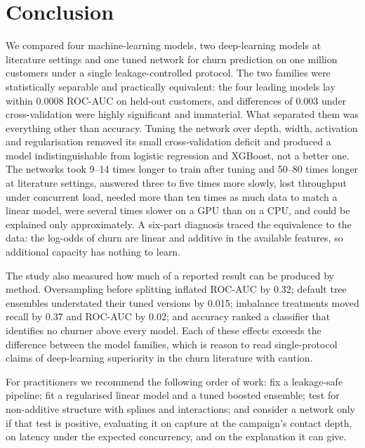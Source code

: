 \documentclass[conference]{IEEEtran}
\begin{document}
\section{Conclusion}
We compared four machine-learning models, two deep-learning models at literature settings and one tuned network for churn prediction on one million customers under a single leakage-controlled protocol. The two families were statistically separable and practically equivalent: the four leading models lay within 0.0008 ROC-AUC on \NTest{} held-out customers, and differences of 0.003 under cross-validation were highly significant and immaterial. What separated them was everything other than accuracy. Tuning the network over depth, width, activation and regularisation removed its small cross-validation deficit and produced a model indistinguishable from logistic regression and XGBoost, not a better one. The networks took 9--14 times longer to train after tuning and 50--80 times longer at literature settings, answered three to five times more slowly, lost throughput under concurrent load, needed more than ten times as much data to match a linear model, were several times slower on a GPU than on a CPU, and could be explained only approximately. A six-part diagnosis traced the equivalence to the data: the log-odds of churn are linear and additive in the available features, so additional capacity has nothing to learn.

The study also measured how much of a reported result can be produced by method. Oversampling before splitting inflated ROC-AUC by 0.32; default tree ensembles understated their tuned versions by 0.015; imbalance treatments moved recall by 0.37 and ROC-AUC by 0.02; and accuracy ranked a classifier that identifies no churner above every model. Each of these effects exceeds the difference between the model families, which is reason to read single-protocol claims of deep-learning superiority in the churn literature with caution.

For practitioners we recommend the following order of work: fix a leakage-safe pipeline; fit a regularised linear model and a tuned boosted ensemble; test for non-additive structure with splines and interactions; and consider a network only if that test is positive, evaluating it on capture at the campaign's contact depth, on latency under the expected concurrency, and on the explanation it can give.
\end{document}
